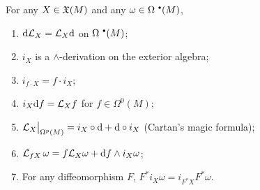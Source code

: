 \begin{prop} For any $X\in\mathfrak{X}(M)$ and any $\omega\in\Omega^{\smbullet }(M)$,
\begin{enumerate}
    \item ${\mathrm{d}}\mathcal{L}_X=\mathcal{L}_X{\mathrm{d}}$ on $\Omega^{\smbullet }(M)$;
    \item $i_X$ is a $\wedge$-derivation on the exterior algebra;
    \item $i_{f\cdot X}=f\cdot i_X$;
    \item $i_X{\mathrm{d}} f=\mathcal{L}_X f$ for $f\in \Omega^0(M)$;
    \item $\restr{\Lie_X}{\Omega^p(M)}=i_X\circ\dd+\dd\circ i_X$ (Cartan's magic formula);
    \item $\mathcal{L}_{fX}\,\omega=f\mathcal{L}_X\omega +{\mathrm{d}} f\wedge i_X\omega$;
    \item For any diffeomorphism $F$, $F^\ast i_X\omega =i_{F^\ast X}F^\ast\omega$.
\end{enumerate}
\end{prop}
